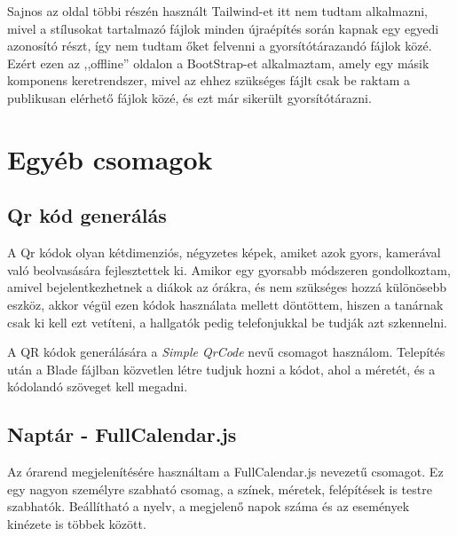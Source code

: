 \documentclass[
]{thesis-ekf}
\theoremstyle{definition}
\theoremstyle{remark}
\begin{document}
Sajnos az oldal többi részén használt Tailwind-et itt nem tudtam alkalmazni, mivel a stílusokat tartalmazó fájlok minden újraépítés során kapnak egy egyedi azonosító részt, így nem tudtam őket felvenni a gyorsítótárazandó fájlok közé. Ezért ezen az ,,offline'' oldalon a BootStrap-et\cite{bootstrap} alkalmaztam, amely egy másik komponens keretrendszer, mivel az ehhez szükséges fájlt csak be raktam a publikusan elérhető fájlok közé, és ezt már sikerült gyorsítótárazni.



\section{Egyéb csomagok}

\subsection{Qr kód generálás}

A Qr kódok olyan kétdimenziós, négyzetes képek, amiket azok gyors, kamerával való beolvasására fejlesztettek ki.\cite{qrCodeWhatIsIt} Amikor egy gyorsabb módszeren gondolkoztam, amivel bejelentkezhetnek a diákok az órákra, és nem szükséges hozzá különösebb eszköz, akkor végül ezen kódok használata mellett döntöttem, hiszen a tanárnak csak ki kell ezt vetíteni, a hallgatók pedig telefonjukkal be tudják azt szkennelni.

A QR kódok generálására a \emph{Simple QrCode}\cite{qrCode} nevű csomagot használom. Telepítés után a Blade fájlban közvetlen létre tudjuk hozni a kódot, ahol a méretét, és a kódolandó szöveget kell megadni.



\subsection{Naptár - FullCalendar.js}

Az órarend megjelenítésére használtam a FullCalendar.js\cite{fullcalendar} nevezetű csomagot. Ez egy nagyon személyre szabható csomag, a színek, méretek, felépítések is testre szabhatók. Beállítható a nyelv, a megjelenő napok száma és az események kinézete is többek között.
\end{document}
